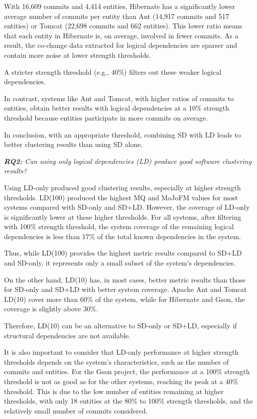 \documentclass{ieeeaccess}
\begin{document}
With 16,609 commits and 4,414 entities, Hibernate has a significantly lower average number of commits per entity than Ant (14,917 commits and 517 entities) or Tomcat (22,698 commits and 662 entities). This lower ratio means that each entity in Hibernate is, on average, involved in fewer commits. As a result, the co-change data extracted for logical dependencies are sparser and contain more noise at lower strength thresholds.

A stricter strength threshold (e.g., 40\%) filters out these weaker logical dependencies.

In contrast, systems like Ant and Tomcat, with higher ratios of commits to entities, obtain better results with logical dependencies at a 10\% strength threshold because entities participate in more commits on average.

In conclusion, with an appropriate threshold, combining SD with LD leads to better clustering results than using SD alone.


\textit{\textbf{RQ2:} Can using only logical dependencies (LD) produce good software clustering results?} 

Using LD-only produced good clustering results, especially at higher strength thresholds. LD(100) produced the highest MQ and MoJoFM values for most systems compared with SD-only and SD+LD. However, the coverage of LD-only is significantly lower at these higher thresholds. For all systems, after filtering with 100\% strength threshold, the system coverage of the remaining logical dependencies is less than 17\% of the total known dependencies in the system.

Thus, while LD(100) provides the highest metric results compared to SD+LD and SD-only, it represents only a small subset of the system's dependencies.

On the other hand, LD(10) has, in most cases, better metric results than those for SD-only and SD+LD with better system coverage. Apache Ant and Tomcat LD(10) cover more than 60\% of the system, while for Hibernate and Gson, the coverage is slightly above 30\%. 

Therefore, LD(10) can be an alternative to SD-only or SD+LD, especially if structural dependencies are not available.

It is also important to consider that LD-only performance at higher strength thresholds depends on the system's characteristics, such as the number of commits and entities. For the Gson project, the performance at a 100\% strength threshold is not as good as for the other systems, reaching its peak at a 40\% threshold. This is due to the low number of entities remaining at higher thresholds, with only 18 entities at the 80\% to 100\% strength thresholds, and the relatively small number of commits considered.
\end{document}
